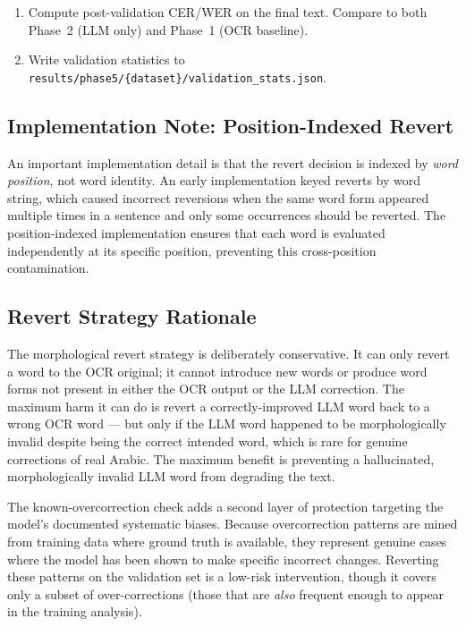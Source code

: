 \begin{enumerate}
  \item Compute post-validation CER/WER on the final text.
        Compare to both Phase~2 (LLM only) and Phase~1 (OCR baseline).

  \item Write validation statistics to
        \texttt{results/phase5/\{dataset\}/validation\_stats.json}.
\end{enumerate}

\subsection{Implementation Note: Position-Indexed Revert}

An important implementation detail is that the revert decision is indexed by
\emph{word position}, not word identity. An early implementation keyed reverts
by word string, which caused incorrect reversions when the same word form
appeared multiple times in a sentence and only some occurrences should be
reverted. The position-indexed implementation ensures that each word is
evaluated independently at its specific position, preventing this
cross-position contamination.

\subsection{Revert Strategy Rationale}
\label{subsec:phase5_rationale}

The morphological revert strategy is deliberately conservative. It can only
revert a word to the OCR original; it cannot introduce new words or produce
word forms not present in either the OCR output or the LLM correction.
The maximum harm it can do is revert a correctly-improved LLM word back to
a wrong OCR word --- but only if the LLM word happened to be morphologically
invalid despite being the correct intended word, which is rare for genuine
corrections of real Arabic. The maximum benefit is preventing a hallucinated,
morphologically invalid LLM word from degrading the text.

The known-overcorrection check adds a second layer of protection targeting
the model's documented systematic biases. Because overcorrection patterns
are mined from training data where ground truth is available, they represent
genuine cases where the model has been shown to make specific incorrect
changes. Reverting these patterns on the validation set is a low-risk
intervention, though it covers only a subset of over-corrections (those that
are \emph{also} frequent enough to appear in the training analysis).

